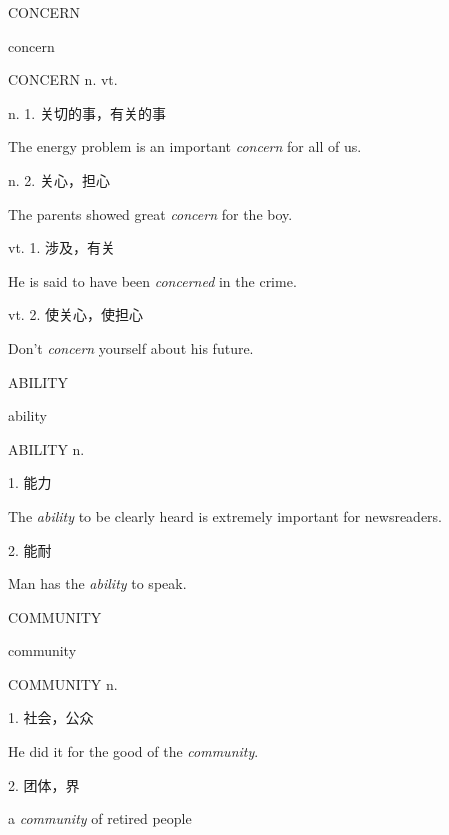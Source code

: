 \begin{flashcard}{
CONCERN

concern
}
\begin{center}
CONCERN n. vt. 
\end{center}
n. 1. 关切的事，有关的事

The energy problem is an important \textit{concern} for all of us.

n. 2. 关心，担心

The parents showed great \textit{concern} for the boy.

vt. 1. 涉及，有关

He is said to have been \textit{concerned} in the crime.

vt. 2. 使关心，使担心

Don't \textit{concern} yourself about his future.

\end{flashcard}
\begin{flashcard}{
ABILITY

ability
}
\begin{center}
ABILITY n. 
\end{center}
1. 能力

The \textit{ability} to be clearly heard is extremely important for newsreaders.

2. 能耐

Man has the \textit{ability} to speak.

\end{flashcard}
\begin{flashcard}{
COMMUNITY

community
}
\begin{center}
COMMUNITY n. 
\end{center}
1. 社会，公众

He did it for the good of the \textit{community}.

2. 团体，界

a \textit{community} of retired people

\end{flashcard}
